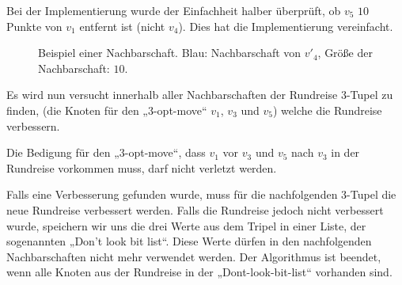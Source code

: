 \begin{bem}
  Bei der Implementierung wurde der Einfachheit halber  überprüft, 
  ob $v_5$ $10$ Punkte von $v_1$ entfernt ist (nicht $v_4$). Dies hat
  die Implementierung vereinfacht. 
\end{bem}
\begin{figure}[bh]
  \centering
  \caption[Beispiel einer Nachbarschaft $\mathcal{N}(v)$]{Beispiel
  einer Nachbarschaft. Blau: Nachbarschaft von $v'_4$, Größe der
  Nachbarschaft: $10$.}
\end{figure}
Es wird nun versucht innerhalb aller Nachbarschaften der Rundreise 3-Tupel zu finden, (die
Knoten für den „3-opt-move“ $v_1$, $v_3$ und $v_5$) welche die Rundreise
verbessern.
\begin{bem}
Die Bedigung für den „3-opt-move“, dass $v_1$ vor $v_3$ und $v_5$ nach
  $v_3$ in der Rundreise vorkommen muss, darf nicht verletzt werden.
\end{bem}
Falls eine Verbesserung gefunden wurde, muss für die nachfolgenden
3-Tupel die neue Rundreise verbessert werden. Falls die Rundreise jedoch
nicht verbessert wurde, speichern wir uns die drei Werte aus dem Tripel
in einer Liste, der sogenannten „Don't look bit list“. Diese Werte dürfen in den
nachfolgenden Nachbarschaften nicht mehr verwendet werden. Der
Algorithmus ist beendet, wenn alle Knoten aus der Rundreise in der
„Dont-look-bit-list“ vorhanden sind.
\newpage

